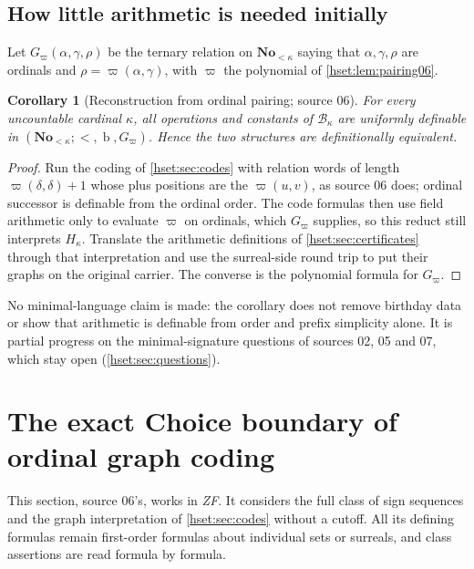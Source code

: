 \documentclass[11pt,letterpaper]{article}
\newtheorem{corollary}[corollary]{Corollary}\aliascntresetthe{corollary}
\theoremstyle{definition}
\theoremstyle{remark}
\newcommand{\No}{\mathbf{No}}
\newcommand{\bd}{\operatorname{b}}
\newcommand{\B}{\mathcal B}
\begin{document}
\subsection{How little arithmetic is needed initially}

Let $G_\varpi(\alpha,\gamma,\rho)$ be the ternary relation on $\No_{<\kappa}$ saying
that $\alpha,\gamma,\rho$ are ordinals and $\rho=\varpi(\alpha,\gamma)$, with
$\varpi$ the polynomial of \cref{hset:lem:pairing06}.

\begin{corollary}[Reconstruction from ordinal pairing; source 06]\label{hset:cor:reduct}
For every uncountable cardinal $\kappa$, all operations and constants of
$\B_\kappa$ are uniformly definable in $(\No_{<\kappa};<,\bd,G_\varpi)$. Hence the two
structures are definitionally equivalent.
\end{corollary}
\begin{proof}
Run the coding of \cref{hset:sec:codes} with relation words of length
$\varpi(\delta,\delta)+1$ whose plus positions are the $\varpi(u,v)$, as source
06 does; ordinal successor is definable from the ordinal order. The code
formulas then use field arithmetic only to evaluate $\varpi$ on ordinals, which
$G_\varpi$ supplies, so this reduct still interprets $H_\kappa$. Translate the
arithmetic definitions of \cref{hset:sec:certificates} through that
interpretation and use the surreal-side round trip to put their graphs on the
original carrier. The converse is the polynomial formula for $G_\varpi$.
\end{proof}

No minimal-language claim is made: the corollary does not remove birthday data
or show that arithmetic is definable from order and prefix simplicity alone.
It is partial progress on the minimal-signature questions of sources 02, 05 and
07, which stay open (\cref{hset:sec:questions}).

\section{The exact Choice boundary of ordinal graph coding}
\label{hset:sec:choice}

This section, source 06's, works in \emph{ZF}. It considers the full class of
sign sequences and the graph interpretation of \cref{hset:sec:codes} without a
cutoff. All its defining formulas remain first-order formulas about individual
sets or surreals, and class assertions are read formula by formula.
\end{document}

